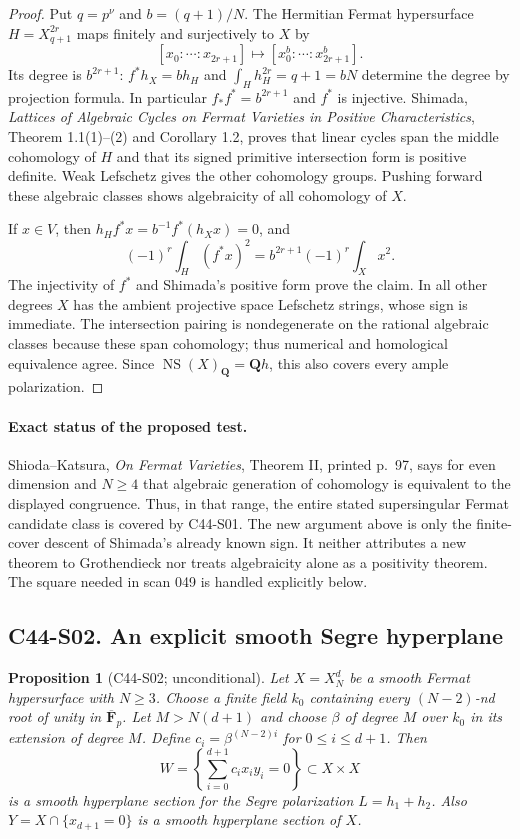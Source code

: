 \documentclass[11pt]{article}
\newtheorem{proposition}[theorem]{Proposition}
\theoremstyle{remark}\newtheorem{remark}[theorem]{Remark}
\begin{document}
\begin{proof}
Put $q=p^\nu$ and $b=(q+1)/N$.  The Hermitian Fermat
hypersurface $H=X_{q+1}^{2r}$ maps finitely and surjectively to
$X$ by
\[
 [x_0:\cdots:x_{2r+1}]
 \longmapsto[x_0^b:\cdots:x_{2r+1}^b].
\]
Its degree is $b^{2r+1}$: $f^*h_X=bh_H$ and
$\int_Hh_H^{2r}=q+1=bN$ determine the degree by projection
formula.  In particular $f_*f^*=b^{2r+1}$ and $f^*$ is injective.
Shimada, \emph{Lattices of Algebraic Cycles on Fermat Varieties
in Positive Characteristics}, Theorem 1.1(1)--(2) and
Corollary 1.2, proves that linear cycles span the middle
cohomology of $H$ and that its signed primitive intersection
form is positive definite.  Weak Lefschetz gives the other
cohomology groups.  Pushing forward these algebraic classes
shows algebraicity of all cohomology of $X$.

If $x\in V$, then
$h_Hf^*x=b^{-1}f^*(h_Xx)=0$, and
\[
 (-1)^r\int_H(f^*x)^2
  =b^{2r+1}(-1)^r\int_Xx^2.
\]
The injectivity of $f^*$ and Shimada's positive form prove the
claim.  In all other degrees $X$ has the ambient projective
space Lefschetz strings, whose sign is immediate.  The
intersection pairing is nondegenerate on the rational
algebraic classes because these span cohomology; thus
numerical and homological equivalence agree.  Since
$\operatorname{NS}(X)_\mathbf Q=\mathbf Qh$, this also covers
every ample polarization.
\end{proof}

\paragraph{Exact status of the proposed test.}
Shioda--Katsura, \emph{On Fermat Varieties}, Theorem II,
printed p.~97, says for even dimension and $N\geq4$ that
algebraic generation of cohomology is equivalent to the
displayed congruence.  Thus, in that range, the entire stated
supersingular Fermat candidate class is covered by C44-S01.
The new argument above is only the finite-cover descent
of Shimada's already known sign.  It neither attributes a
new theorem to Grothendieck nor treats algebraicity alone as
a positivity theorem.  The square needed in scan 049 is
handled explicitly below.

\subsection*{C44-S02. An explicit smooth Segre hyperplane}

\begin{proposition}[C44-S02; unconditional]
Let $X=X_N^d$ be a smooth Fermat hypersurface with $N\geq3$.
Choose a finite field $k_0$ containing every $(N-2)$-nd root
of unity in $\overline{\mathbf F}_p$.  Let $M>N(d+1)$ and
choose $\beta$ of degree $M$ over $k_0$ in its extension of
degree $M$.  Define $c_i=\beta^{(N-2)i}$ for
$0\leq i\leq d+1$.  Then
\[
 W=\left\{\sum_{i=0}^{d+1}c_ix_iy_i=0\right\}
       \subset X\times X
\]
is a smooth hyperplane section for the Segre polarization
$L=h_1+h_2$.  Also $Y=X\cap\{x_{d+1}=0\}$ is a smooth
hyperplane section of $X$.
\end{proposition}
\end{document}
